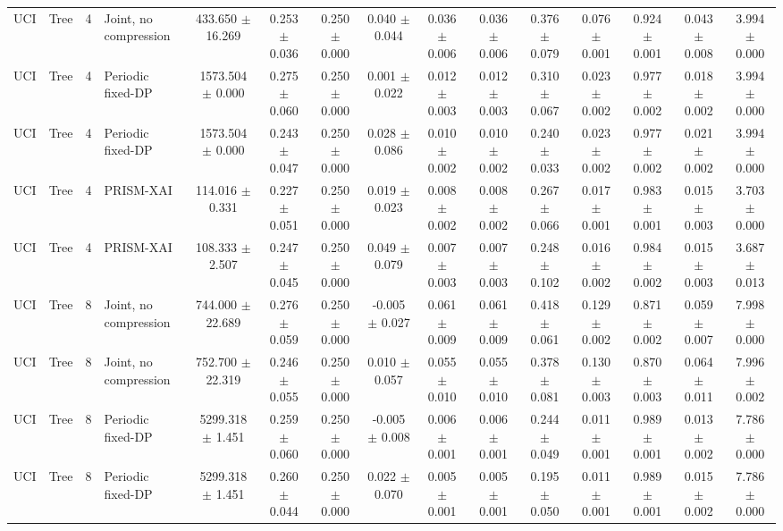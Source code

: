 \begin{table}[t]
\begin{tabular}{llllccccccccccc}
UCI & Tree & 4 & Joint, no compression & 433.650 $\pm$ 16.269 & 0.253 $\pm$ 0.036 & 0.250 $\pm$ 0.000 & 0.040 $\pm$ 0.044 & 0.036 $\pm$ 0.006 & 0.036 $\pm$ 0.006 & 0.376 $\pm$ 0.079 & 0.076 $\pm$ 0.001 & 0.924 $\pm$ 0.001 & 0.043 $\pm$ 0.008 & 3.994 $\pm$ 0.000 \\
UCI & Tree & 4 & Periodic fixed-DP & 1573.504 $\pm$ 0.000 & 0.275 $\pm$ 0.060 & 0.250 $\pm$ 0.000 & 0.001 $\pm$ 0.022 & 0.012 $\pm$ 0.003 & 0.012 $\pm$ 0.003 & 0.310 $\pm$ 0.067 & 0.023 $\pm$ 0.002 & 0.977 $\pm$ 0.002 & 0.018 $\pm$ 0.002 & 3.994 $\pm$ 0.000 \\
UCI & Tree & 4 & Periodic fixed-DP & 1573.504 $\pm$ 0.000 & 0.243 $\pm$ 0.047 & 0.250 $\pm$ 0.000 & 0.028 $\pm$ 0.086 & 0.010 $\pm$ 0.002 & 0.010 $\pm$ 0.002 & 0.240 $\pm$ 0.033 & 0.023 $\pm$ 0.002 & 0.977 $\pm$ 0.002 & 0.021 $\pm$ 0.002 & 3.994 $\pm$ 0.000 \\
UCI & Tree & 4 & PRISM-XAI & 114.016 $\pm$ 0.331 & 0.227 $\pm$ 0.051 & 0.250 $\pm$ 0.000 & 0.019 $\pm$ 0.023 & 0.008 $\pm$ 0.002 & 0.008 $\pm$ 0.002 & 0.267 $\pm$ 0.066 & 0.017 $\pm$ 0.001 & 0.983 $\pm$ 0.001 & 0.015 $\pm$ 0.003 & 3.703 $\pm$ 0.000 \\
UCI & Tree & 4 & PRISM-XAI & 108.333 $\pm$ 2.507 & 0.247 $\pm$ 0.045 & 0.250 $\pm$ 0.000 & 0.049 $\pm$ 0.079 & 0.007 $\pm$ 0.003 & 0.007 $\pm$ 0.003 & 0.248 $\pm$ 0.102 & 0.016 $\pm$ 0.002 & 0.984 $\pm$ 0.002 & 0.015 $\pm$ 0.003 & 3.687 $\pm$ 0.013 \\
UCI & Tree & 8 & Joint, no compression & 744.000 $\pm$ 22.689 & 0.276 $\pm$ 0.059 & 0.250 $\pm$ 0.000 & -0.005 $\pm$ 0.027 & 0.061 $\pm$ 0.009 & 0.061 $\pm$ 0.009 & 0.418 $\pm$ 0.061 & 0.129 $\pm$ 0.002 & 0.871 $\pm$ 0.002 & 0.059 $\pm$ 0.007 & 7.998 $\pm$ 0.000 \\
UCI & Tree & 8 & Joint, no compression & 752.700 $\pm$ 22.319 & 0.246 $\pm$ 0.055 & 0.250 $\pm$ 0.000 & 0.010 $\pm$ 0.057 & 0.055 $\pm$ 0.010 & 0.055 $\pm$ 0.010 & 0.378 $\pm$ 0.081 & 0.130 $\pm$ 0.003 & 0.870 $\pm$ 0.003 & 0.064 $\pm$ 0.011 & 7.996 $\pm$ 0.002 \\
UCI & Tree & 8 & Periodic fixed-DP & 5299.318 $\pm$ 1.451 & 0.259 $\pm$ 0.060 & 0.250 $\pm$ 0.000 & -0.005 $\pm$ 0.008 & 0.006 $\pm$ 0.001 & 0.006 $\pm$ 0.001 & 0.244 $\pm$ 0.049 & 0.011 $\pm$ 0.001 & 0.989 $\pm$ 0.001 & 0.013 $\pm$ 0.002 & 7.786 $\pm$ 0.000 \\
UCI & Tree & 8 & Periodic fixed-DP & 5299.318 $\pm$ 1.451 & 0.260 $\pm$ 0.044 & 0.250 $\pm$ 0.000 & 0.022 $\pm$ 0.070 & 0.005 $\pm$ 0.001 & 0.005 $\pm$ 0.001 & 0.195 $\pm$ 0.050 & 0.011 $\pm$ 0.001 & 0.989 $\pm$ 0.001 & 0.015 $\pm$ 0.002 & 7.786 $\pm$ 0.000 \\

\end{tabular}
\end{table}

